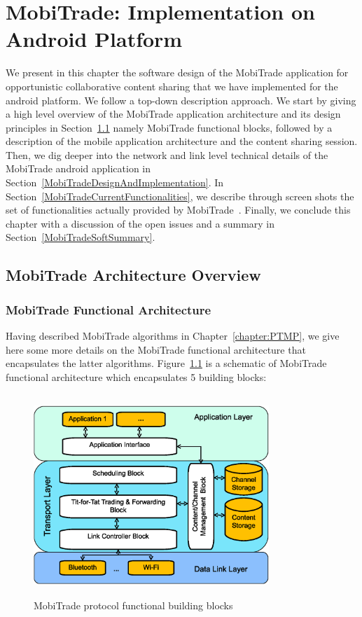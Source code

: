\chapter{MobiTrade: Implementation on Android Platform}
\label{chapter:MobiTrade}
\minitoc

We present in this chapter the software design of the MobiTrade application for opportunistic collaborative content sharing that we have implemented for the android platform. We follow a top-down description approach. We start by giving a high level overview of the MobiTrade application architecture and its design principles in Section~\ref{MobiTradeArchitecture} namely MobiTrade functional blocks, followed by a description of the mobile application architecture and the content sharing session. Then, we dig deeper into the network and link level technical details of the MobiTrade android application in Section~\ref{MobiTradeDesignAndImplementation}. In Section~\ref{MobiTradeCurrentFunctionalities}, we describe through screen shots the set of functionalities actually provided by MobiTrade~\cite{MobiTradeAndroid}. Finally, we conclude this chapter with a discussion of the open issues and a summary in Section~\ref{MobiTradeSoftSummary}.

\section{MobiTrade Architecture Overview}
\label{MobiTradeArchitecture}

\subsection{MobiTrade Functional Architecture}
\label{MobiTrade-functional-architecture}

Having described MobiTrade algorithms in Chapter~\ref{chapter:PTMP}, we give here some more details on the MobiTrade functional architecture that encapsulates the latter algorithms. Figure~\ref{MobiTrade-node-architecture} is a schematic of MobiTrade functional architecture which encapsulates 5 building blocks:

\begin{figure}[!h]
\centering
\includegraphics[width=3.5in,height=3in]{Chapitre6/MobiTrade_Node.eps}
\caption{MobiTrade protocol functional building blocks}
\label{MobiTrade-node-architecture}
\end{figure}

